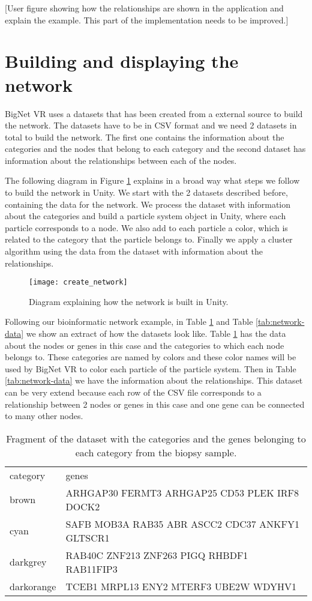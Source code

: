 [User figure showing how the relationships are shown in the application and explain the example. This part of the implementation needs to be improved.]


\section{Building and displaying the network}
BigNet VR uses a datasets that has been created from a external source to build the network. The datasets have to be in CSV format and we need 2 datasets in total to build the network. The first one contains the information about the categories and the nodes that belong to each category and the second dataset has information about the relationships between each of the nodes.

The following diagram in Figure \ref{fig:create_network} explains in a broad way what steps we follow to build the network in Unity. We start with the 2 datasets described before, containing the data for the network. We process the dataset with information about the categories and build a particle system object in Unity, where each particle corresponds to a node. We also add to each particle a color, which is related to the category that the particle belongs to. Finally we apply a cluster algorithm using the data from the dataset with information about the relationships.

\begin{figure}[h!]
    \centering%
    \texttt{[image: create\_network]}
    \caption{Diagram explaining how the network is built in Unity.}
    \label{fig:create_network}
\end{figure}%

Following our bioinformatic network example, in Table \ref{tab:categories-data} and Table \ref{tab:network-data} we show an extract of how the datasets look like. Table \ref{tab:categories-data} has the data about the nodes or genes in this case and the categories to which each node belongs to. These categories are named by colors and these color names will be used by BigNet VR to color each particle of the particle system. Then in Table \ref{tab:network-data} we have the information about the relationships. This dataset can be very extend because each row of the CSV file corresponds to a relationship between 2 nodes or genes in this case and one gene can be connected to many other nodes.

\begin{table}[h!]
\centering
\begin{tabular}{ll}
\hline
category & genes          \\
brown   & ARHGAP30 FERMT3 ARHGAP25 CD53 PLEK IRF8 DOCK2\\
cyan  & SAFB MOB3A RAB35 ABR ASCC2 CDC37 ANKFY1 GLTSCR1\\
darkgrey  & RAB40C ZNF213 ZNF263 PIGQ RHBDF1 RAB11FIP3\\
darkorange  & TCEB1 MRPL13 ENY2 MTERF3 UBE2W WDYHV1\\
\hline
\end{tabular}
\caption{Fragment of the dataset with the categories and the genes belonging to each category from the biopsy sample.}
\label{tab:categories-data}
\end{table}

